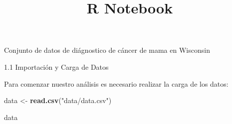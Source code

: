 \documentclass[
]{article}
\title{R Notebook}
\author{}
\date{\vspace{-2.5em}}
\newenvironment{Shaded}{\begin{snugshade}}{\end{snugshade}}
\newcommand{\FunctionTok}[1]{\textcolor[rgb]{0.13,0.29,0.53}{\textbf{#1}}}
\newcommand{\NormalTok}[1]{#1}
\newcommand{\OtherTok}[1]{\textcolor[rgb]{0.56,0.35,0.01}{#1}}
\newcommand{\StringTok}[1]{\textcolor[rgb]{0.31,0.60,0.02}{#1}}
\begin{document}
\maketitle

Conjunto de datos de diágnostico de cáncer de mama en Wisconsin

1.1 Importación y Carga de Datos

Para comenzar nuestro análisis es necesario realizar la carga de los
datos:

\begin{Shaded}
\begin{Highlighting}[]
\NormalTok{data }\OtherTok{\textless{}{-}} \FunctionTok{read.csv}\NormalTok{(}\StringTok{"data/data.csv"}\NormalTok{)}

\NormalTok{data}
\end{Highlighting}
\end{Shaded}
\end{document}
